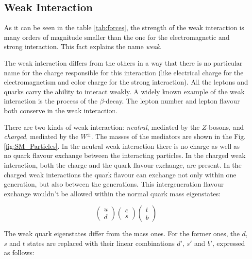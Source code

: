 \subsection{Weak Interaction}

As it can be seen in the table \ref{tab:forces}, the strength of the weak interaction is many orders of magnitude smaller than the one for the 
electromagnetic and strong interaction. This fact explains the name \textit{weak}.

The weak interaction differs from the others in a way that there is no particular name for the charge responsible for this interaction 
(like electrical charge for the electromagnetism and color charge for the strong interaction). All the leptons and quarks carry the ability to interact
weakly. A widely known example of the weak interaction is the process of the $\beta$-decay. The lepton number and lepton flavour both conserve in the weak interaction.

There are two kinds of weak interaction: \textit{neutral}, mediated by the 
$Z$-bosons, and \textit{charged}, mediated by the $W^{\pm}$. The masses of the 
mediators are shown in the Fig. \ref{fig:SM_Particles}.	In the neutral weak interaction there is no charge as well as no quark flavour exchange between the 
interacting particles. In the charged weak interaction, both the charge and the quark flavour exchange, are present. In the charged weak interactions 
the quark flavour can exchange not only within one generation, but also between the generations.
This intergeneration flavour exchange wouldn't be allowed within the normal quark mass eigenstates:

\begin{equation}
\left( \begin{array}{c}
       u \\ d
      \end{array} \right)
\left( \begin{array}{c}
       c \\ s
      \end{array} \right)
\left( \begin{array}{c}
       t \\ b
      \end{array} \right)
\end{equation}
  
The weak quark eigenstates differ from the mass ones. For the former ones, the $d$, $s$ and $t$ states are replaced with their linear combinations $d'$, $s'$ and $b'$,
expressed as follows:

